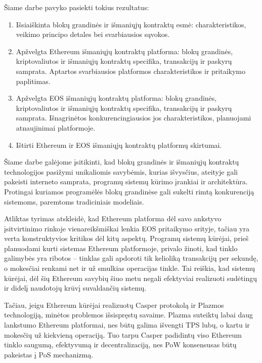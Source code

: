 \documentclass{VUMIFPSkursinis}
\begin{document}
Šiame darbe pavyko pasiekti tokius rezultatus:
\begin{enumerate}
    \item Išsiaiškinta blokų grandinės ir išmaniųjų kontraktų esmė: charakteristikos, veikimo principo detales bei svarbiausios sąvokos.
    \item Apžvelgta Ethereum išmaniųjų kontraktų platforma: blokų grandinės, kriptovaliutos ir išmaniųjų kontraktų specifika, transakcijų ir paskyrų samprata. Aptartos svarbiausios platformos charakteristikos ir pritaikymo paplitimas.
    \item Apžvelgta EOS išmaniųjų kontraktų platforma: blokų grandinės, kriptovaliutos ir išmaniųjų kontraktų specifika, transakcijų ir paskyrų samprata. Išnagrinėtos konkurencingiausios jos charakteristikos, planuojami atnaujinimai platformoje.
    \item Ištirti Ethereum ir EOS išmaniųjų kontraktų platformų skirtumai.
\end{enumerate}
\vspace{0.75\baselineskip}

Šiame darbe galėjome įsitikinti, kad blokų grandinės ir išmaniųjų kontraktų technologijos pasižymi unikaliomis savybėmis, kurias išvysčius, ateityje gali pakeisti interneto samprata, programų sistemų kūrimo įrankiai ir architektūra. Protingai kuriamos programėlės blokų grandinėse gali sukelti rimtą konkurenciją sistemoms, paremtoms tradiciniais modeliais. 

Atliktas tyrimas atskleidė, kad Ethereum platforma dėl savo ankstyvo įsitvirtinimo rinkoje vienareikšmiškai lenkia EOS pritaikymo srityje, tačiau yra verta konstruktyvios kritikos dėl kitų aspektų. Programų sistemų kūrėjai, prieš planuodami kurti sistemas Ethereum platformoje, privalo žinoti, kad tinklo galimybės yra ribotos – tinklas gali apdoroti tik kelioliką transakcijų per sekundę, o mokesčiai renkami net ir už smulkias operacijas tinkle. Tai reiškia, kad sistemų kūrėjai, dėl šių Ethereum savybių šiuo metu negali efektyviai realizuoti sudėtingų ir didelį naudotojų krūvį suvaldančių sistemų.

Tačiau, jeigu Ethereum kūrėjai realizuotų Casper protokolą ir Plazmos technologiją, minėtos problemos išsispręstų savaime. Plazma suteiktų labai daug lankstumo Ethereum platformai, nes būtų galima išvengti TPS lubų, o kartu ir mokesčių už kiekvieną operaciją. Tuo tarpu Casper padidintų viso Ethereum tinklo saugumą, efektyvumą ir decentralizaciją, nes PoW konsensusas būtų pakeistas į PoS mechanizmą.
\end{document}
